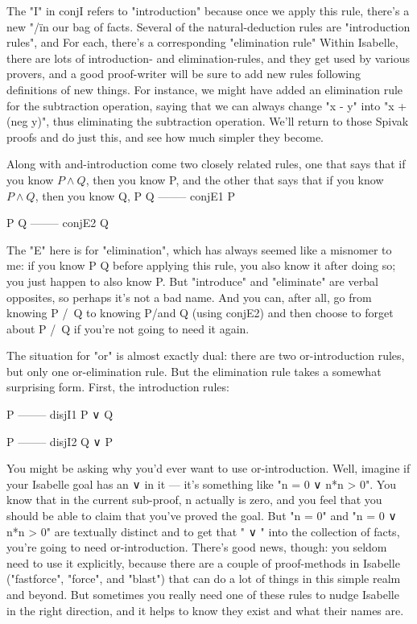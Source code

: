 The "I" in conjI refers to "introduction" because once we apply this rule, there's a new "/\" in our bag of facts. Several of the natural-deduction rules are "introduction rules", and 
For each, there's a corresponding "elimination rule"
Within Isabelle, there are lots of introduction- and elimination-rules, and they get used by various provers, and a good proof-writer will be sure to add new rules following definitions of new things. For instance, we might have added an elimination rule for the subtraction operation, saying that we can always change "x - y" into "x + (neg y)", thus eliminating the subtraction operation. We'll return to those Spivak proofs and do just this, and see how much simpler they become. 

Along with and-introduction come two closely related rules, one that says that if you know $P \wedge  Q$, then you know P, and the other that says that if you know $P \wedge  Q$, then you know Q,
P \wedge  Q
-------- conjE1
    P

P \wedge  Q
-------- conjE2
    Q

The "E" here is for "elimination", which has always seemed like a misnomer to me: if you know P \wedge  Q before applying this rule, you also know it after doing so; you just happen to also know P. But "introduce" and "eliminate" are verbal opposites, so perhaps it's not a bad name. And you can, after all, go from knowing P /\ Q to knowing P/\Q and Q (using conjE2) and then choose to forget about P /\ Q if you're not going to need it again. 

The situation for "or" is almost exactly dual: there are two or-introduction rules, but only one or-elimination rule. But the elimination rule takes a somewhat surprising form. First, the introduction rules:

   P
--------  disjI1
P ∨ Q

   P
--------  disjI2
Q ∨ P

You might be asking why you'd ever want to use or-introduction. Well, imagine if your Isabelle goal has an ∨ in it --- it's something like "n = 0  ∨ n*n > 0". You know that in the current sub-proof, n actually is zero, and you feel that you should be able to claim that you've proved the goal. But "n = 0" and "n = 0  ∨ n*n > 0" are textually distinct and to get that "  ∨ " into the collection of facts, you're going to need or-introduction. There's good news, though: you seldom need to use it explicitly, because there are a couple of proof-methods in Isabelle ("fastforce", "force", and "blast") that can do a lot of things in this simple realm and beyond. But sometimes you really need one of these rules to nudge Isabelle in the right direction, and it helps to know they exist and what their names are. 

